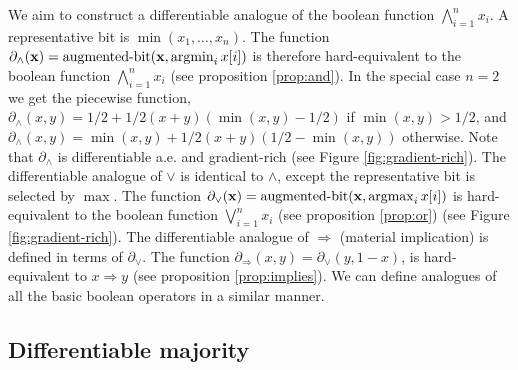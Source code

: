 \documentclass{article}
\theoremstyle{plain}
\theoremstyle{definition}
\theoremstyle{remark}
\begin{document}
We aim to construct a differentiable analogue of the boolean function $\bigwedge_{i=1}^{n} x_i$. A representative bit is $\operatorname{min}(x_{1},\dots,x_{n})$. The function
$\partial_{\wedge}({\bf x}) = \operatorname{augmented-bit}({\bf x}, \operatorname{argmin}\limits_{i} x[i])$
is therefore hard-equivalent to the boolean function $\bigwedge_{i=1}^{n} x_i$ (see proposition \ref{prop:and}). In the special case $n=2$ we get the piecewise function,
$\partial_{\wedge}\!(x, y) = 1/2 + 1/2(x + y)(\operatorname{min}(x,y) - 1/2)$ if $\operatorname{min}(x,y) > 1/2$, and $\partial_{\wedge}\!(x, y) = \operatorname{min}(x,y) + 1/2(x + y)(1/2 - \operatorname{min}(x,y))$
otherwise. Note that $\partial_{\wedge}$ is differentiable a.e. and gradient-rich (see Figure \ref{fig:gradient-rich}). The differentiable analogue of $\vee$ is identical to $\wedge$, except the representative bit is selected by $\operatorname{max}$. The function
$\partial_{\vee}({\bf x}) = \operatorname{augmented-bit}({\bf x}, \operatorname{argmax}\limits_{i} x[i])$ is hard-equivalent to the boolean function $\bigvee_{i=1}^{n} x_i$ (see proposition \ref{prop:or}) (see Figure \ref{fig:gradient-rich}).
The differentiable analogue of $\Rightarrow$ (material implication) is defined in terms of $\partial_{\vee}$. The function
$\partial_{\Rightarrow}(x, y) = \partial_{\vee}\!(y, 1-x)$,
is hard-equivalent to $x \Rightarrow y$ (see proposition \ref{prop:implies}). We can define  analogues of all the basic boolean operators in a similar manner.

\subsection{Differentiable majority}
\end{document}
